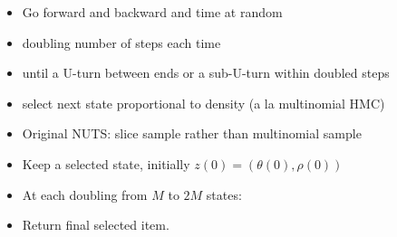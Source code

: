 \documentclass[10pt]{report}
\begin{document}
\begin{itemize}
\item Go forward and backward and time at random
\item doubling number of steps each time
\item until a U-turn between ends or a sub-U-turn within doubled steps
\item select next state proportional to density (a la multinomial HMC)
  \vfill
\item Original NUTS: slice sample rather than multinomial sample
\end{itemize}

\begin{itemize}
\item Keep a selected state, initially $z(0) = (\theta(0), \rho(0))$
\item At each doubling from $M$ to $2M$ states:
\item Return final selected item.
\end{itemize}
\end{document}

